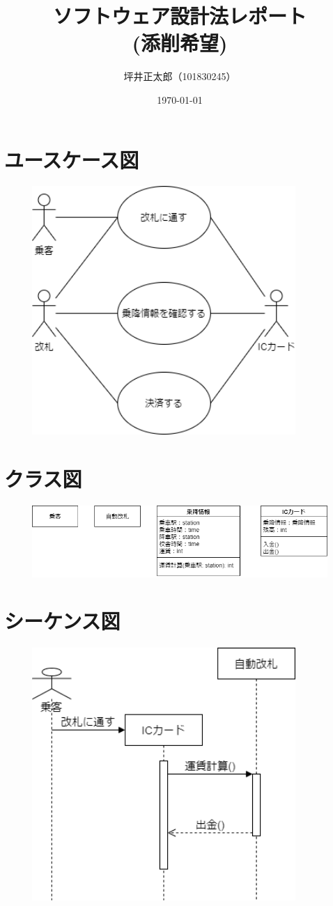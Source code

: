 \documentclass[a4paper,10pt]{jsarticle}
\begin{document}
\title{ソフトウェア設計法レポート\\(添削希望)}
\author{坪井正太郎（101830245）}
\date{\today}
\maketitle
\section{ユースケース図}
\begin{figure}[H]
  \centering
  \includegraphics[width=10cm]{./01.drawio.png}
  \caption{}
  \label{}
\end{figure}

\section{クラス図}
\begin{figure}[H]
  \centering
  \includegraphics[width=\linewidth]{./02.drawio.png}
  \caption{}
  \label{}
\end{figure}

\section{シーケンス図}
\begin{figure}[H]
  \centering
  \includegraphics[width=10cm]{./03.drawio.png}
  \caption{}
  \label{}
\end{figure}
\end{document}
